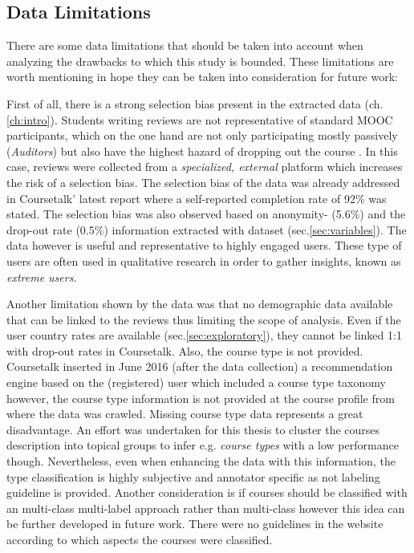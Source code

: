 \documentclass[
	a4paper,
	pdftex,
	12pt,	
	footinclude=true,
	fleqn,
	final,
	]{report}%
\begin{document}
\subsection*{Data Limitations} %
\label{sec:limitations}
\vspace{-0.3cm}
There are some data limitations that should be taken into account when analyzing
the drawbacks to which this study is bounded. These limitations are worth mentioning 
in hope they can be taken into consideration for future work:

First of all, there is a strong selection bias present in the extracted data (ch.\ref{ch:intro}).
Students writing reviews are not representative of standard MOOC participants, 
which on the one hand are not only participating mostly passively (\emph{Auditors}) 
\cite{Kizilcec2013,Wen2014} but also have the highest hazard of dropping out 
the course \cite{Koller2013}. In this case, reviews were collected from a 
\emph{specialized, external} platform which increases the risk of a selection bias. 
The selection bias of the data was already addressed in Coursetalk' latest 
report \cite{Coursetalk2015} where a self-reported completion rate of 92\% was stated.
The selection bias was also observed based on anonymity- (5.6\%) and 
the drop-out rate (0.5\%) information extracted with dataset (sec.\ref{sec:variables}).
The data however is useful and representative to highly engaged users.
These type of users are often used in qualitative research in order to gather insights, 
known as \emph{extreme users}. 

Another limitation shown by the data was that no demographic data available 
that can be linked to the reviews thus limiting the scope of analysis. 
Even if the user country rates are available (sec.\ref{sec:exploratory}), 
they cannot be linked 1:1 with drop-out rates in Coursetalk.
Also, the course type is not provided. %
Coursetalk inserted in June 2016 (after the data collection) a recommendation engine based on 
the (registered) user which included a course type taxonomy however, the course type information  
is not provided at the course profile from where the data was crawled. 
Missing course type data represents a great disadvantage. 
An effort was undertaken for this thesis to cluster the courses description
into topical groups to infer e.g. \emph{course types} with a low performance though.
Nevertheless, even when enhancing the data with this information, the type classification is 
highly subjective and annotator specific as not labeling 
guideline is provided. Another consideration is if courses should be classified with 
an multi-class multi-label approach rather than multi-class however this idea can be further 
developed in future work. There were no guidelines in the website according 
to which aspects the courses were classified. 
\end{document}

